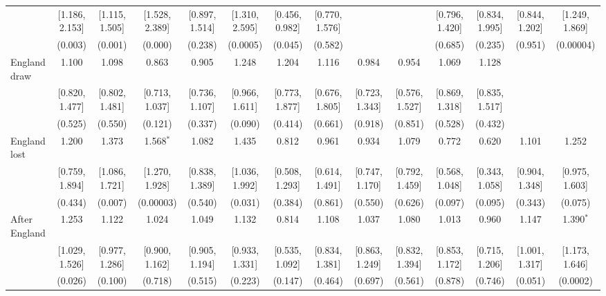 \documentclass[12pt, a4paper]{article}
\begin{document}
\begin{table}
{\begin{threeparttable}
\begin{tabular}{@{\extracolsep{1pt}}lccccccccccccc}
  & [1.186, 2.153] & [1.115, 1.505] & [1.528, 2.389] & [0.897, 1.514] & [1.310, 2.595] & [0.456, 0.982] & [0.770, 1.576] &  &  & [0.796, 1.420] & [0.834, 1.995] & [0.844, 1.202] & [1.249, 1.869] \\ 
  & (0.003) & (0.001) & (0.000) & (0.238) & (0.0005) & (0.045) & (0.582) &  &  & (0.685) & (0.235) & (0.951) & (0.00004) \\ 
  England draw & 1.100 & 1.098 & 0.863 & 0.905 & 1.248 & 1.204 & 1.116 & 0.984 & 0.954 & 1.069 & 1.128 &  &  \\ 
  & [0.820, 1.477] & [0.802, 1.481] & [0.713, 1.037] & [0.736, 1.107] & [0.966, 1.611] & [0.773, 1.877] & [0.676, 1.805] & [0.723, 1.343] & [0.576, 1.527] & [0.869, 1.318] & [0.835, 1.517] &  &  \\ 
  & (0.525) & (0.550) & (0.121) & (0.337) & (0.090) & (0.414) & (0.661) & (0.918) & (0.851) & (0.528) & (0.432) &  &  \\ 
  England lost & 1.200 & 1.373 & 1.568$^{*}$ & 1.082 & 1.435 & 0.812 & 0.961 & 0.934 & 1.079 & 0.772 & 0.620 & 1.101 & 1.252 \\ 
  & [0.759, 1.894] & [1.086, 1.721] & [1.270, 1.928] & [0.838, 1.389] & [1.036, 1.992] & [0.508, 1.293] & [0.614, 1.491] & [0.747, 1.170] & [0.792, 1.459] & [0.568, 1.048] & [0.343, 1.058] & [0.904, 1.348] & [0.975, 1.603] \\ 
  & (0.434) & (0.007) & (0.00003) & (0.540) & (0.031) & (0.384) & (0.861) & (0.550) & (0.626) & (0.097) & (0.095) & (0.343) & (0.075) \\ 
  After England & 1.253 & 1.122 & 1.024 & 1.049 & 1.132 & 0.814 & 1.108 & 1.037 & 1.080 & 1.013 & 0.960 & 1.147 & 1.390$^{*}$ \\ 
  & [1.029, 1.526] & [0.977, 1.286] & [0.900, 1.162] & [0.905, 1.194] & [0.933, 1.331] & [0.535, 1.092] & [0.834, 1.381] & [0.863, 1.249] & [0.832, 1.394] & [0.853, 1.172] & [0.715, 1.206] & [1.001, 1.317] & [1.173, 1.646] \\ 
  & (0.026) & (0.100) & (0.718) & (0.515) & (0.223) & (0.147) & (0.464) & (0.697) & (0.561) & (0.878) & (0.746) & (0.051) & (0.0002) \\



\end{tabular}
\end{threeparttable}}
\end{table}
\end{document}
